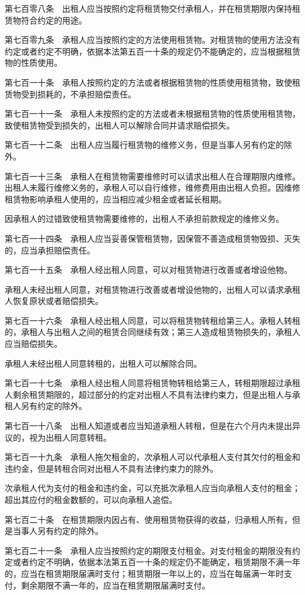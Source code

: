 \documentclass[UTF8,12pt,a4paper]{ctexbook}
\begin{document}
第七百零八条　出租人应当按照约定将租赁物交付承租人，并在租赁期限内保持租赁物符合约定的用途。

第七百零九条　承租人应当按照约定的方法使用租赁物。对租赁物的使用方法没有约定或者约定不明确，依据本法第五百一十条的规定仍不能确定的，应当根据租赁物的性质使用。

第七百一十条　承租人按照约定的方法或者根据租赁物的性质使用租赁物，致使租赁物受到损耗的，不承担赔偿责任。

第七百一十一条　承租人未按照约定的方法或者未根据租赁物的性质使用租赁物，致使租赁物受到损失的，出租人可以解除合同并请求赔偿损失。

第七百一十二条　出租人应当履行租赁物的维修义务，但是当事人另有约定的除外。

第七百一十三条　承租人在租赁物需要维修时可以请求出租人在合理期限内维修。出租人未履行维修义务的，承租人可以自行维修，维修费用由出租人负担。因维修租赁物影响承租人使用的，应当相应减少租金或者延长租期。

因承租人的过错致使租赁物需要维修的，出租人不承担前款规定的维修义务。

第七百一十四条　承租人应当妥善保管租赁物，因保管不善造成租赁物毁损、灭失的，应当承担赔偿责任。

第七百一十五条　承租人经出租人同意，可以对租赁物进行改善或者增设他物。

承租人未经出租人同意，对租赁物进行改善或者增设他物的，出租人可以请求承租人恢复原状或者赔偿损失。

第七百一十六条　承租人经出租人同意，可以将租赁物转租给第三人。承租人转租的，承租人与出租人之间的租赁合同继续有效；第三人造成租赁物损失的，承租人应当赔偿损失。

承租人未经出租人同意转租的，出租人可以解除合同。

第七百一十七条　承租人经出租人同意将租赁物转租给第三人，转租期限超过承租人剩余租赁期限的，超过部分的约定对出租人不具有法律约束力，但是出租人与承租人另有约定的除外。

第七百一十八条　出租人知道或者应当知道承租人转租，但是在六个月内未提出异议的，视为出租人同意转租。

第七百一十九条　承租人拖欠租金的，次承租人可以代承租人支付其欠付的租金和违约金，但是转租合同对出租人不具有法律约束力的除外。

次承租人代为支付的租金和违约金，可以充抵次承租人应当向承租人支付的租金；超出其应付的租金数额的，可以向承租人追偿。

第七百二十条　在租赁期限内因占有、使用租赁物获得的收益，归承租人所有，但是当事人另有约定的除外。

第七百二十一条　承租人应当按照约定的期限支付租金。对支付租金的期限没有约定或者约定不明确，依据本法第五百一十条的规定仍不能确定，租赁期限不满一年的，应当在租赁期限届满时支付；租赁期限一年以上的，应当在每届满一年时支付，剩余期限不满一年的，应当在租赁期限届满时支付。
\end{document}
